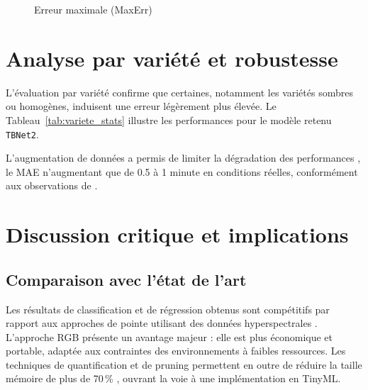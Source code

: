 \begin{figure}[H]
	\centering
	\caption{Erreur maximale (MaxErr)}
\end{figure}

\section{Analyse par variété et robustesse}
\label{subsec:analyse_variete}

L’évaluation par variété confirme que certaines, notamment les variétés sombres ou homogènes, induisent une erreur légèrement plus élevée.
Le Tableau~\ref{tab:variete_stats} illustre les performances pour le modèle retenu \texttt{TBNet2}.

L’augmentation de données a permis de limiter la dégradation des performances \cite{shorten2019survey}, le MAE n’augmentant que de 0.5 à 1 minute en conditions réelles, conformément aux observations de \cite{tastan2023}.

\section{Discussion critique et implications}

\subsection{Comparaison avec l’état de l’art}

Les résultats de classification et de régression obtenus sont compétitifs par rapport aux approches de pointe utilisant des données hyperspectrales \cite{mendoza2018prediction}.
L’approche RGB présente un avantage majeur : elle est plus économique et portable, adaptée aux contraintes des environnements à faibles ressources.
Les techniques de quantification et de pruning permettent en outre de réduire la taille mémoire de plus de 70\,\% \cite{jacob2018quantization, han2016deep}, ouvrant la voie à une implémentation en TinyML.

